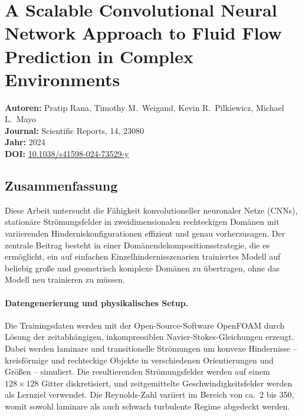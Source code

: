 \documentclass[a4paper,12pt]{article}
\begin{document}
\section*{A Scalable Convolutional Neural Network Approach to Fluid Flow Prediction
in Complex Environments}

\textbf{Autoren:} Pratip Rana, Timothy M.\ Weigand, Kevin R.\ Pilkiewicz, Michael L.\ Mayo \\
\textbf{Journal:} Scientific Reports, 14, 23080 \\
\textbf{Jahr:} 2024 \\
\textbf{DOI:} \href{https://doi.org/10.1038/s41598-024-73529-y}{10.1038/s41598-024-73529-y}

\subsection*{Zusammenfassung}

Diese Arbeit untersucht die Fähigkeit konvolutioneller neuronaler Netze (CNNs), stationäre
Strömungsfelder in zweidimensionalen rechteckigen Domänen mit variierenden Hinderniskonfigurationen
effizient und genau vorherzusagen. Der zentrale Beitrag besteht in einer Domänendekompositionsstrategie,
die es ermöglicht, ein auf einfachen Einzelhindernisszenarien trainiertes Modell auf beliebig große
und geometrisch komplexe Domänen zu übertragen, ohne das Modell neu trainieren zu müssen.

\paragraph{Datengenerierung und physikalisches Setup.}
Die Trainingsdaten werden mit der Open-Source-Software OpenFOAM durch Lösung der zeitabhängigen,
inkompressiblen Navier-Stokes-Gleichungen erzeugt. Dabei werden laminare und transitionelle Strömungen
um konvexe Hindernisse -- kreisförmige und rechteckige Objekte in verschiedenen Orientierungen und
Größen -- simuliert. Die resultierenden Strömungsfelder werden auf einem $128 \times 128$ Gitter
diskretisiert, und zeitgemittelte Geschwindigkeitsfelder werden als Lernziel verwendet.
Die Reynolds-Zahl variiert im Bereich von ca.\ 2 bis 350, womit sowohl laminare als auch
schwach turbulente Regime abgedeckt werden.
\end{document}

